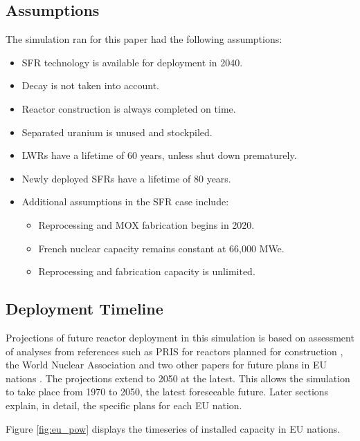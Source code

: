 \subsection{Assumptions}
The simulation ran for this paper had the following assumptions:
\begin{itemize}
        \item \gls{SFR} technology is available for deployment in 2040.
        \item Decay is not taken into account.
        \item Reactor construction is always completed on time.
        \item Separated uranium is unused and stockpiled.
        \item \glspl{LWR} have a lifetime of 60 years, unless shut down prematurely.
        \item Newly deployed \glspl{SFR} have a lifetime of 80 years.
        \item Additional assumptions in the \gls{SFR} case include:
        \begin{itemize}
        	\item Reprocessing and \gls{MOX} fabrication begins in 2020.
        	\item French nuclear capacity remains constant at 66,000 MWe.
        	\item Reprocessing and fabrication capacity is unlimited.
        \end{itemize}
\end{itemize}


\subsection{Deployment Timeline}
Projections of future reactor deployment in this simulation is based on assessment of analyses
from references such as \gls{PRIS} for reactors planned for construction \cite{iaea_pris_nodate},
the World Nuclear Association and two other papers for future plans in EU nations
\cite{world_nuclear_association_nuclear_2017, joskow_future_2012, hatch_politics_2015}.
The projections extend to 2050 at the latest. This allows the simulation to take place from
1970 to 2050, the latest foreseeable future. Later sections explain, in detail, the specific plans for each \gls{EU} nation.

Figure \ref{fig:eu_pow} displays the
timeseries of installed capacity in \gls{EU} nations.

